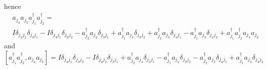\documentclass[aps,preprint]{revtex4}%
\begin{document}
hence
\begin{align}
&  a_{j_{4}}a_{j_{3}}a_{j_{1}}^{\dagger}a_{j_{2}}^{\dagger}=\nonumber\\
&  I\delta_{j_{4}j_{2}}\delta_{j_{3}j_{1}}-I\delta_{j_{4}j_{1}}\delta
_{j_{3}j_{2}}-a_{j_{2}}^{\dagger}a_{j_{4}}\delta_{j_{3}j_{1}}+a_{j_{1}%
}^{\dagger}a_{j_{4}}\delta_{j_{3}j_{2}}+a_{j_{2}}^{\dagger}a_{j_{3}}%
\delta_{j_{4}j_{1}}-a_{j_{1}}^{\dagger}a_{j_{3}}\delta_{j_{4}j_{2}}+a_{j_{1}%
}^{\dagger}a_{j_{2}}^{\dagger}a_{j_{4}}a_{j_{3}}%
\end{align}
and
\begin{equation}
\left[  a_{j_{1}}^{\dagger}a_{j_{2}}^{\dagger},a_{j_{4}}a_{j_{3}}\right]
=I\delta_{j_{4}j_{1}}\delta_{j_{3}j_{2}}-I\delta_{j_{4}j_{2}}\delta
_{j_{3}j_{1}}+a_{j_{2}}^{\dagger}a_{j_{4}}\delta_{j_{3}j_{1}}-a_{j_{1}%
}^{\dagger}a_{j_{4}}\delta_{j_{3}j_{2}}-a_{j_{2}}^{\dagger}a_{j_{3}}%
\delta_{j_{4}j_{1}}+a_{j_{1}}^{\dagger}a_{j_{3}}\delta_{j_{4}j_{2}}%
\end{equation}
\end{document}
